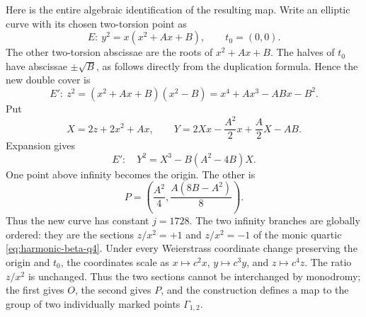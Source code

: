 Here is the entire algebraic identification of the resulting
map. Write an elliptic curve with its chosen two-torsion
point as
\[
 E:\ y^2=x(x^2+Ax+B),\qquad t_0=(0,0).
\]
The other two-torsion abscissae are the roots of
\(x^2+Ax+B\). The halves of \(t_0\) have abscissae
\(\pm\sqrt B\), as follows directly from the duplication
formula. Hence the new double cover is
\begin{equation}
 E':\ z^2=(x^2+Ax+B)(x^2-B)
              =x^4+Ax^3-ABx-B^2.                           \label{eq:harmonic-beta-q4}
\end{equation}
Put
\[
 X=2z+2x^2+Ax,\qquad
 Y=2Xx-\frac{A^2}2x+\frac A2X-AB.
\]
Expansion gives
\begin{equation}
 E':\quad Y^2=X^3-B(A^2-4B)X.                               \label{eq:harmonic-beta-q5}
\end{equation}
One point above infinity becomes the origin. The other is
\begin{equation}
 P=\left(\frac{A^2}4,\frac{A(8B-A^2)}8\right).               \label{eq:harmonic-beta-q6}
\end{equation}
Thus the new curve has constant \(j=1728\).
The two infinity branches are globally ordered: they are the
sections \(z/x^2=+1\) and \(z/x^2=-1\) of the monic quartic
\eqref{eq:harmonic-beta-q4}. Under every Weierstrass coordinate change preserving
the origin and \(t_0\), the coordinates scale as
\(x\mapsto c^2x\), \(y\mapsto c^3y\), and
\(z\mapsto c^4z\). The ratio \(z/x^2\) is unchanged.
Thus the two sections cannot be interchanged by monodromy;
the first gives \(O\), the second gives \(P\), and the
construction defines a map to the group of two individually
marked points \(\Gamma_{1,2}\).

